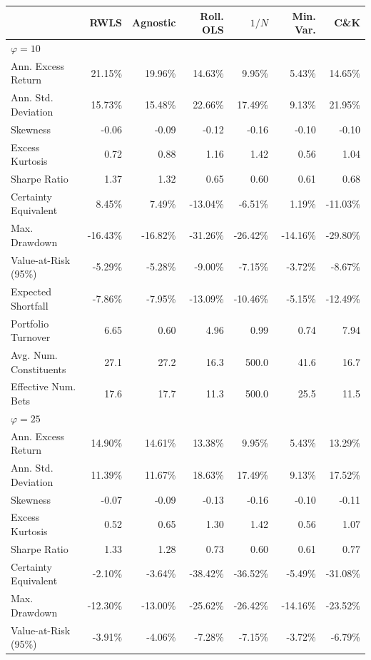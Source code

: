 \begin{tabular*}{\textwidth}{l@{\extracolsep{\fill}}rrrrrr}
\toprule
 & RWLS & Agnostic & Roll. OLS & $1/N$ & Min. Var. & C\&K \\
\midrule
\multicolumn{7}{l}{\textit{$\varphi = 10$}} \\
\midrule
Ann. Excess Return & 21.15\% & 19.96\% & 14.63\% & 9.95\% & 5.43\% & 14.65\% \\
Ann. Std. Deviation & 15.73\% & 15.48\% & 22.66\% & 17.49\% & 9.13\% & 21.95\% \\
Skewness & -0.06 & -0.09 & -0.12 & -0.16 & -0.10 & -0.10 \\
Excess Kurtosis & 0.72 & 0.88 & 1.16 & 1.42 & 0.56 & 1.04 \\
Sharpe Ratio & 1.37 & 1.32 & 0.65 & 0.60 & 0.61 & 0.68 \\
Certainty Equivalent & 8.45\% & 7.49\% & -13.04\% & -6.51\% & 1.19\% & -11.03\% \\
Max. Drawdown & -16.43\% & -16.82\% & -31.26\% & -26.42\% & -14.16\% & -29.80\% \\
Value-at-Risk (95\%) & -5.29\% & -5.28\% & -9.00\% & -7.15\% & -3.72\% & -8.67\% \\
Expected Shortfall & -7.86\% & -7.95\% & -13.09\% & -10.46\% & -5.15\% & -12.49\% \\
Portfolio Turnover & 6.65 & 0.60 & 4.96 & 0.99 & 0.74 & 7.94 \\
Avg. Num. Constituents & 27.1 & 27.2 & 16.3 & 500.0 & 41.6 & 16.7 \\
Effective Num. Bets & 17.6 & 17.7 & 11.3 & 500.0 & 25.5 & 11.5 \\
\midrule
\multicolumn{7}{l}{\textit{$\varphi = 25$}} \\
\midrule
Ann. Excess Return & 14.90\% & 14.61\% & 13.38\% & 9.95\% & 5.43\% & 13.29\% \\
Ann. Std. Deviation & 11.39\% & 11.67\% & 18.63\% & 17.49\% & 9.13\% & 17.52\% \\
Skewness & -0.07 & -0.09 & -0.13 & -0.16 & -0.10 & -0.11 \\
Excess Kurtosis & 0.52 & 0.65 & 1.30 & 1.42 & 0.56 & 1.07 \\
Sharpe Ratio & 1.33 & 1.28 & 0.73 & 0.60 & 0.61 & 0.77 \\
Certainty Equivalent & -2.10\% & -3.64\% & -38.42\% & -36.52\% & -5.49\% & -31.08\% \\
Max. Drawdown & -12.30\% & -13.00\% & -25.62\% & -26.42\% & -14.16\% & -23.52\% \\
Value-at-Risk (95\%) & -3.91\% & -4.06\% & -7.28\% & -7.15\% & -3.72\% & -6.79\% \\

\end{tabular*}
